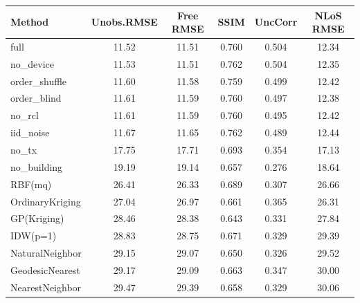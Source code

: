 \begin{tabular}{lccccc}
\toprule
Method & Unobs.RMSE & Free RMSE & SSIM & UncCorr & NLoS RMSE \\
\midrule
full & 11.52 & 11.51 & 0.760 & 0.504 & 12.34 \\
no_device & 11.53 & 11.51 & 0.762 & 0.504 & 12.35 \\
order_shuffle & 11.60 & 11.58 & 0.759 & 0.499 & 12.42 \\
order_blind & 11.61 & 11.59 & 0.760 & 0.497 & 12.38 \\
no_rcl & 11.61 & 11.59 & 0.760 & 0.495 & 12.42 \\
iid_noise & 11.67 & 11.65 & 0.762 & 0.489 & 12.44 \\
no_tx & 17.75 & 17.71 & 0.693 & 0.354 & 17.13 \\
no_building & 19.19 & 19.14 & 0.657 & 0.276 & 18.64 \\
RBF(mq) & 26.41 & 26.33 & 0.689 & 0.307 & 26.66 \\
OrdinaryKriging & 27.04 & 26.97 & 0.661 & 0.365 & 26.31 \\
GP(Kriging) & 28.46 & 28.38 & 0.643 & 0.331 & 27.84 \\
IDW(p=1) & 28.83 & 28.75 & 0.671 & 0.329 & 29.39 \\
NaturalNeighbor & 29.15 & 29.07 & 0.650 & 0.326 & 29.52 \\
GeodesicNearest & 29.17 & 29.09 & 0.663 & 0.347 & 30.00 \\
NearestNeighbor & 29.47 & 29.39 & 0.658 & 0.329 & 30.06 \\
\bottomrule
\end{tabular}